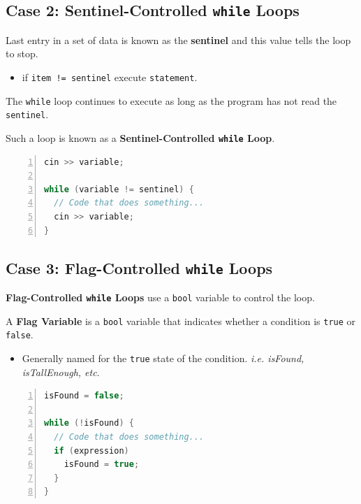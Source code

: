 \documentclass{article}
\begin{document}
\subsection{Case 2: Sentinel-Controlled \texttt{while} Loops}

Last entry in a set of data is known as the \textbf{sentinel} and this value
tells the loop to stop.

\begin{itemize}
  \item if \texttt{item != sentinel} execute \texttt{statement}.
\end{itemize}

The \texttt{while} loop continues to execute as long as the program has not read
the \texttt{sentinel}.

\vspace{8pt}
Such a loop is known as a \textbf{Sentinel-Controlled \texttt{while} Loop}.

\begin{lstlisting}[language=C++, caption={Sentinel-Controlled \texttt{while} Loop
  Syntax}, numbers=left]
cin >> variable;

while (variable != sentinel) {
  // Code that does something...
  cin >> variable;
}
\end{lstlisting}

\subsection{Case 3: Flag-Controlled \texttt{while} Loops}

\textbf{Flag-Controlled \texttt{while} Loops} use a \texttt{bool} variable to
control the loop.

\vspace{8pt}
A \textbf{Flag Variable} is a \texttt{bool} variable that indicates whether a
condition is \texttt{true} or \texttt{false}.
\begin{itemize}
  \item Generally named for the \texttt{true} state of the condition. \textit{i.e. isFound, isTallEnough, etc}.
\end{itemize}

\begin{lstlisting}[language=C++, caption={Flag-Controlled \texttt{while} Loop
  Example}, numbers=left]
isFound = false;

while (!isFound) {
  // Code that does something...
  if (expression)
    isFound = true;
  }
}
\end{lstlisting}
\end{document}
